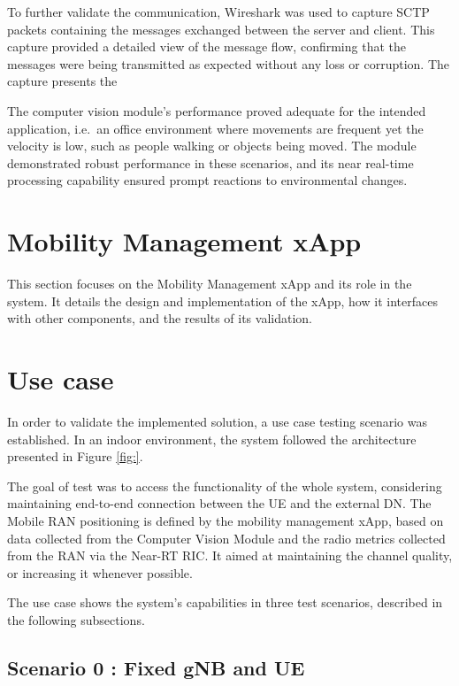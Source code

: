 To further validate the communication, Wireshark was used to capture SCTP packets containing the messages exchanged between the server and client. This capture provided a detailed view of the message flow, confirming that the messages were being transmitted as expected without any loss or corruption.
The capture presents the





The computer vision module's performance proved adequate for the intended application, i.e.\ an office environment where movements are frequent yet the velocity is low, such as people walking or objects being moved.
The module demonstrated robust performance in these scenarios, and its near real-time processing capability ensured prompt reactions to environmental changes.



\section{Mobility Management xApp}\label{sec:mm_xapp}
This section focuses on the Mobility Management xApp and its role in the system. It details the design and implementation of the xApp, how it interfaces with other components, and the results of its validation.

\section{Use case}\label{sec:use_case}
In order to validate the implemented solution, a use case testing scenario was established. In an indoor environment, the system followed the architecture presented in Figure \ref{fig:}. 


The goal of test was to access the functionality of the whole system, considering maintaining end-to-end connection between the UE and the external DN. The Mobile RAN positioning is defined by the mobility management xApp, based on data collected from the Computer Vision Module and the radio metrics collected from the RAN via the Near-RT RIC. It aimed at maintaining the channel quality, or increasing it whenever possible.

The use case shows the system's capabilities in three test scenarios, described in the following subsections.

\subsection{Scenario 0 : Fixed gNB and UE}

